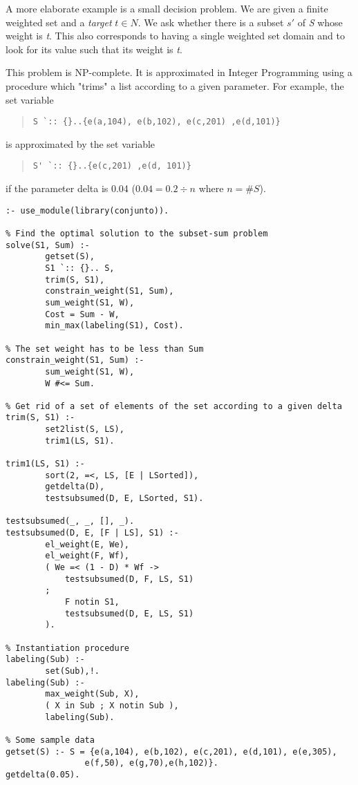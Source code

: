 A more elaborate example is a small decision problem. We are given a
finite weighted set and a {\em target} $t \in N$. We ask whether there
is a subset $s'$ of {\em S} whose weight is {\em t}. This also corresponds to
having a single weighted set domain and to look for its value such that
its  weight is {\em t}. 

This problem is NP-complete. It is approximated in Integer Programming
using a procedure which "trims" a list according to a given parameter.
For example, the set variable
\begin{quote}\begin{verbatim}
S `:: {}..{e(a,104), e(b,102), e(c,201) ,e(d,101)}
\end{verbatim}\end{quote}
is approximated by the set variable
\begin{quote}\begin{verbatim}
S' `:: {}..{e(c,201) ,e(d, 101)}
\end{verbatim}\end{quote}
if the parameter
delta is 0.04 ($0.04 = 0.2 \div n$ where $n = \# S$).
\begin{verbatim}
:- use_module(library(conjunto)).

% Find the optimal solution to the subset-sum problem
solve(S1, Sum) :-
        getset(S),
        S1 `:: {}.. S,
        trim(S, S1),
        constrain_weight(S1, Sum),
        sum_weight(S1, W),
        Cost = Sum - W,
        min_max(labeling(S1), Cost).

% The set weight has to be less than Sum
constrain_weight(S1, Sum) :-
        sum_weight(S1, W),
        W #<= Sum.

% Get rid of a set of elements of the set according to a given delta
trim(S, S1) :-
        set2list(S, LS),
        trim1(LS, S1).
        
trim1(LS, S1) :-
        sort(2, =<, LS, [E | LSorted]), 
        getdelta(D),
        testsubsumed(D, E, LSorted, S1).

testsubsumed(_, _, [], _).
testsubsumed(D, E, [F | LS], S1) :-
        el_weight(E, We),
        el_weight(F, Wf),
        ( We =< (1 - D) * Wf ->
            testsubsumed(D, F, LS, S1)
        ;
            F notin S1,
            testsubsumed(D, E, LS, S1)
        ).

% Instantiation procedure
labeling(Sub) :-
        set(Sub),!.
labeling(Sub) :-
        max_weight(Sub, X),
        ( X in Sub ; X notin Sub ),
        labeling(Sub).

% Some sample data
getset(S) :- S = {e(a,104), e(b,102), e(c,201), e(d,101), e(e,305),
                e(f,50), e(g,70),e(h,102)}.
getdelta(0.05).
\end{verbatim}

